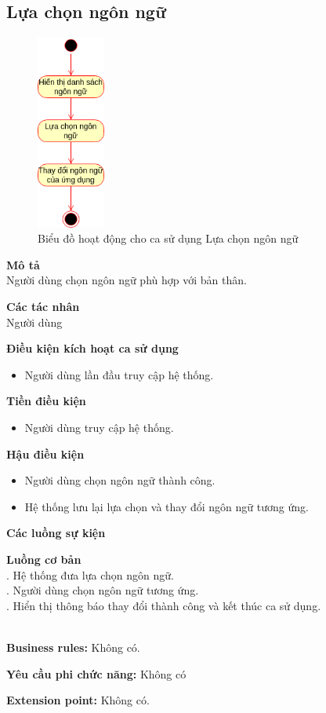 \subsection{Lựa chọn ngôn ngữ}
\begin{figure}[H]
    \centering
    \includegraphics[width=0.2\textwidth]{img/Activity_graph-Lựa chọn ngôn ngữ.drawio.png}
    \caption{Biểu đồ hoạt động cho ca sử dụng Lựa chọn ngôn ngữ}
\end{figure}
\textbf{\indent Mô tả}\\
\indent Người dùng chọn ngôn ngữ phù hợp với bản thân.

\textbf{Các tác nhân}\\
\indent Người dùng

\textbf{Điều kiện kích hoạt ca sử dụng}
\begin{itemize}
    \item Người dùng lần đầu truy cập hệ thống.
\end{itemize}

\textbf{Tiền điều kiện}
\begin{itemize}
    \item Người dùng truy cập hệ thống.
\end{itemize}

\textbf{Hậu điều kiện}
\begin{itemize}
    \item Người dùng chọn ngôn ngữ thành công.
    \item Hệ thống lưu lại lựa chọn và thay đổi ngôn ngữ tương ứng.
\end{itemize}

\textbf{Các luồng sự kiện}

\begin{small}
\textbf{Luồng cơ bản}\\
. Hệ thống đưa lựa chọn ngôn ngữ.\\
. Người dùng chọn ngôn ngữ tương ứng.\\
. Hiển thị thông báo thay đổi thành công và kết thúc ca sử dụng.\\
\end{small}\\
\textbf{\indent Business rules:} Không có.

\textbf{Yêu cầu phi chức năng: }Không có

\textbf{Extension point:} Không có.

